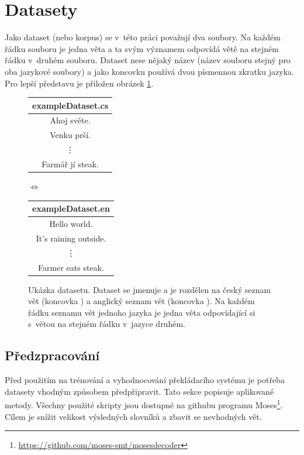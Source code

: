 \section{Datasety}\label{section:datasets}
Jako dataset (nebo korpus) se v~této práci považují dva soubory. Na každém řádku souboru je jedna věta a ta svým významem odpovídá větě na stejném řádku v~druhém souboru. Dataset nese nějaký název (název souboru stejný pro oba jazykové soubory) a jako koncovku používá dvou písmennou zkratku jazyka. Pro lepší představu je přiložen obrázek \ref{img:dataset}.

\begin{figure}[H]
    \begin{center}
        \begin{tabular}{|c|}
          \hline
          exampleDataset.cs\\
          \hline
          Ahoj světe. \\
          Venku prší. \\
          \vdots \\
          Farmář jí steak. \\
          \hline
        \end{tabular}
        $\Longleftrightarrow$
        \begin{tabular}{|c|}
          \hline
          exampleDataset.en\\
          \hline
          Hello world. \\
          It's raining outside. \\
          \vdots \\
          Farmer eats steak. \\
          \hline
        \end{tabular}
    \end{center}
	\caption{Ukázka datasetu. Dataset se jmenuje  a je rozdělen na český seznam vět (koncovka ) a anglický seznam vět (koncovka ). Na každém řádku seznamu vět jednoho jazyka je jedna věta odpovídající si s~větou na stejném řádku v~jazyce druhém.}
	\label{img:dataset}
\end{figure}

\subsection{Předzpracování} \label{subsection:preparing}
Před použitím na trénování a vyhodnocování překládacího systému je potřeba datasety vhodným způsobem předpřipravit. Tato sekce popisuje aplikované metody. Všechny použité skripty jsou dostupné na githubu programu Moses\footnote{\url{https://github.com/moses-smt/mosesdecoder}}. Cílem je snížit velikost výsledných slovníků a zbavit se nevhodných vět.

